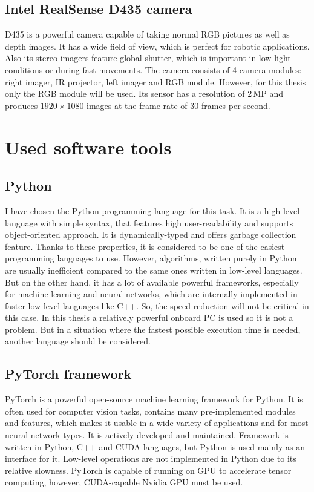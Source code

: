\subsection{Intel RealSense D435 camera}

D435 is a powerful camera capable of taking normal RGB pictures as well as depth images. It has a wide field of view, which is perfect for robotic applications. Also its stereo imagers feature global shutter, which is important in low-light conditions or during fast movements. The camera consists of 4 camera modules: right imager, IR projector, left imager and RGB module. However, for this thesis only the RGB module will be used. Its sensor has a resolution of 2\,MP and produces $1920\times1080$ images at the frame rate of 30 frames per second.


\section{Used software tools}

\subsection{Python}

I have chosen the Python programming language for this task. It is a high-level language with simple syntax, that features high user-readability and supports object-oriented approach. It is dynamically-typed and offers garbage collection feature. Thanks to these properties, it is considered to be one of the easiest programming languages to use. However, algorithms, written purely in Python are usually inefficient compared to the same ones written in low-level languages. But on the other hand, it has a lot of available powerful frameworks, especially for machine learning and neural networks, which are internally implemented in faster low-level languages like C++. So, the speed reduction will not be critical in this case. In this thesis a relatively powerful onboard PC is used so it is not a problem. But in a situation where the fastest possible execution time is needed, another language should be considered. 

\subsection{PyTorch framework}

PyTorch is a powerful open-source machine learning framework for Python. It is often used for computer vision tasks, contains many pre-implemented modules and features, which makes it usable in a wide variety of applications and for most neural network types. It is actively developed and maintained. Framework is written in Python, C++ and CUDA languages, but Python is used mainly as an interface for it. Low-level operations are not implemented in Python due to its relative slowness. PyTorch is capable of running on GPU to accelerate tensor computing, however, CUDA-capable Nvidia GPU must be used. 



